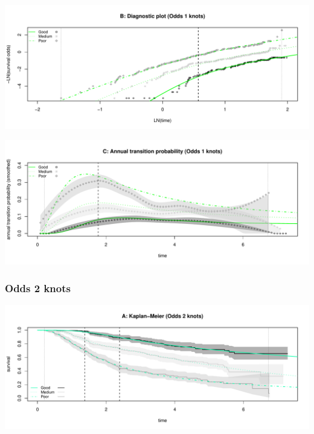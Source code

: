 \documentclass[
]{article}
\begin{document}
\begin{flushleft}\includegraphics[height=0.25\textheight]{BC_OS_output/Images/Figure_spline_models-11} \end{flushleft}

\begin{flushleft}\includegraphics[height=0.25\textheight]{BC_OS_output/Images/Figure_spline_models-12} \end{flushleft}

\clearpage

\subsubsection{Odds 2 knots}\label{odds-2-knots}

\begin{flushleft}\includegraphics[height=0.25\textheight]{BC_OS_output/Images/Figure_spline_models-13} \end{flushleft}
\end{document}
